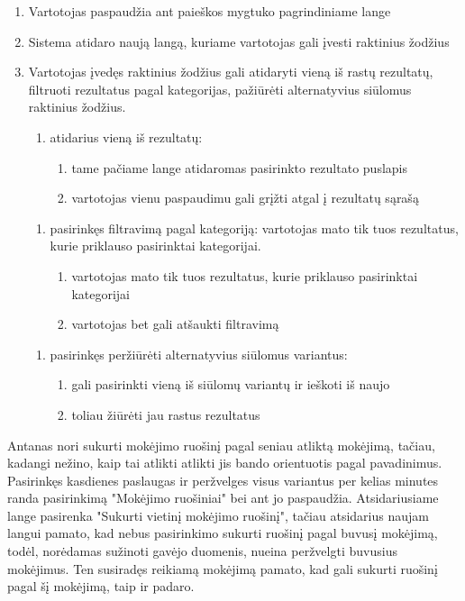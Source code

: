 \documentclass{VUMIFPSkursinis}
\begin{document}
\begin{enumerate}
	\item Vartotojas paspaudžia ant paieškos mygtuko pagrindiniame lange
	\item Sistema atidaro naują langą, kuriame vartotojas gali įvesti raktinius žodžius
	\item Vartotojas įvedęs raktinius žodžius gali atidaryti vieną iš rastų rezultatų, filtruoti rezultatus pagal kategorijas, pažiūrėti alternatyvius siūlomus raktinius žodžius.
	\begin{enumerate}
		\item atidarius vieną iš rezultatų:
		\begin{enumerate}
			\item tame pačiame lange atidaromas pasirinkto rezultato puslapis
			\item vartotojas vienu paspaudimu gali grįžti atgal į rezultatų sąrašą
		\end{enumerate}
	\end{enumerate}
	\begin{enumerate}
		\item pasirinkęs filtravimą pagal kategoriją: vartotojas mato tik tuos rezultatus, kurie priklauso pasirinktai kategorijai.
		\begin{enumerate}
			\item vartotojas mato tik tuos rezultatus, kurie priklauso pasirinktai kategorijai
			\item vartotojas bet gali atšaukti filtravimą
		\end{enumerate}
	\end{enumerate}
	\begin{enumerate}
		\item pasirinkęs peržiūrėti alternatyvius siūlomus variantus:
		\begin{enumerate}
			\item gali pasirinkti vieną iš siūlomų variantų ir ieškoti iš naujo
			\item toliau žiūrėti jau rastus rezultatus
		\end{enumerate}
	\end{enumerate}
\end{enumerate}
Antanas nori sukurti mokėjimo ruošinį pagal seniau atliktą mokėjimą, tačiau, kadangi nežino, kaip tai atlikti atlikti jis bando orientuotis pagal pavadinimus. Pasirinkęs kasdienes paslaugas ir peržvelges visus variantus per kelias minutes randa pasirinkimą "Mokėjimo ruošiniai" bei ant jo paspaudžia. Atsidariusiame lange pasirenka "Sukurti vietinį mokėjimo ruošinį", tačiau atsidarius naujam langui pamato, kad nebus pasirinkimo sukurti ruošinį pagal buvusį mokėjimą, todėl, norėdamas sužinoti gavėjo duomenis, nueina peržvelgti buvusius mokėjimus. Ten susiradęs reikiamą mokėjimą pamato, kad gali sukurti ruošinį pagal šį mokėjimą, taip ir padaro.
\end{document}

